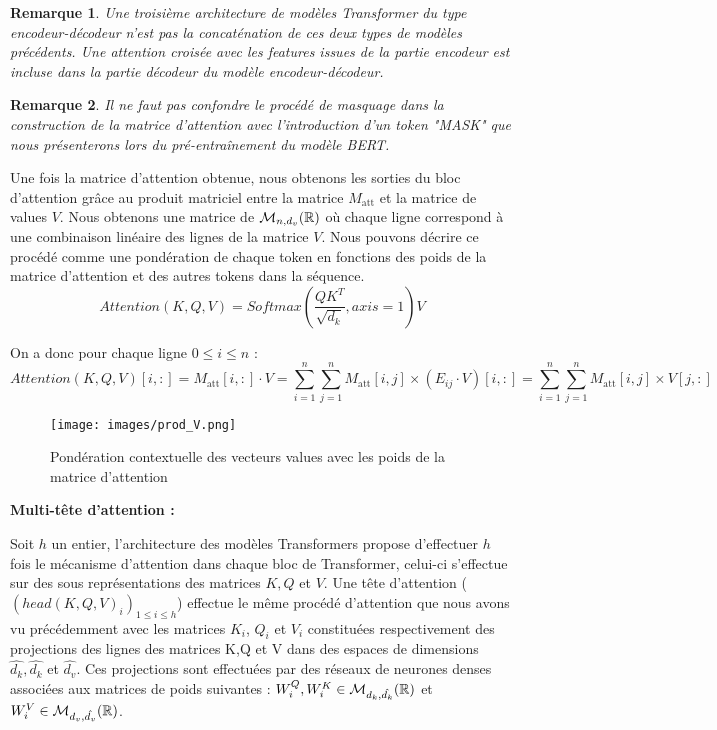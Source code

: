 \documentclass[12pt]{article}
\newtheorem{rmq}{Remarque}
\theoremstyle{definition}
\begin{document}
\begin{rmq}
	Une troisième architecture de modèles Transformer du type encodeur-décodeur n'est pas la concaténation de ces deux types de modèles précédents. Une attention croisée avec les features issues de la partie encodeur est incluse dans la partie décodeur du modèle encodeur-décodeur.
\end{rmq}

\begin{rmq}
	Il ne faut pas confondre le procédé de masquage dans la construction de la matrice d'attention avec l'introduction d'un token \textit{"MASK"} que nous présenterons lors du pré-entraînement du modèle BERT.
\end{rmq}


Une fois la matrice d'attention obtenue, nous obtenons les sorties du bloc d'attention grâce au produit matriciel entre la matrice \(M_{\text{att}}\) et la matrice de values \(V\). Nous obtenons une matrice de \(\mathcal{M}_{n,d_v}(\mathbb{R})\) où chaque ligne correspond à une combinaison linéaire des lignes de la matrice \(V\). Nous pouvons décrire ce procédé comme une pondération de chaque token en fonctions des poids de la matrice d'attention et des autres tokens dans la séquence. 
$$Attention(K,Q,V) = Softmax(\dfrac{QK^T}{\sqrt{d_k}},axis = 1)V$$

On a donc pour chaque ligne $0\leq i \leq n$ :
	$$Attention(K,Q,V)[i,:] = M_{\text{att}}[i,:] \cdot V = \sum_{i=1}^{n}\sum_{j=1}^{n} M_{\text{att}}[i,j] \times \left(E_{ij}\cdot V\right)[i,:] = \sum_{i=1}^{n}\sum_{j=1}^{n} M_{\text{att}}[i,j] \times V[j,:]$$	
\begin{figure*}[!h]
	\centering
	\texttt{[image: images/prod\_V.png]}
	\caption{Pondération contextuelle des vecteurs values avec les poids de la matrice d'attention}
\end{figure*}

\textbf{Multi-tête d'attention :}

Soit $h$ un entier, l'architecture des modèles Transformers propose d'effectuer $h$ fois le mécanisme d'attention dans chaque bloc de Transformer, celui-ci s'effectue sur des sous représentations des matrices $K,Q$ et $V$. Une tête d'attention ($\left(head(K,Q,V)_i\right)_{1\leq i\leq h}$) effectue le même procédé d'attention que nous avons vu précédemment avec les matrices $K_i$, $Q_i$ et $V_i$ constituées respectivement des projections des lignes des matrices K,Q et V dans des espaces de dimensions $\hat{d_k},\hat{d_k}$ et $\hat{d_v}$. Ces projections sont effectuées par des réseaux de neurones denses associées aux matrices de poids suivantes : $W_i^Q, W_i^K\in\mathcal{M}_{d_k,\hat{d_k}}(\mathbb{R})$ et $W_i^V\in\mathcal{M}_{d_v,\hat{d_v}}(\mathbb{R})$.
\end{document}
